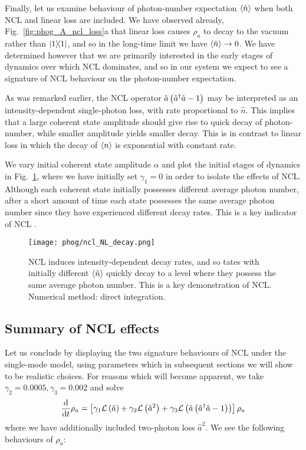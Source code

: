 Finally, let us examine behaviour of photon-number expectation $\ev{\hat{n}}$ when both NCL and linear loss are included. We have observed already, Fig.~\ref{fig:phog_A_ncl_loss}a that linear loss causes $\rho_a$ to decay to the vacuum rather than $\dyad{1}$, and so in the long-time limit we have $\ev{\hat{n}} \rightarrow 0$. We have determined however that we are primarily interested in the early stages of dynamics over which NCL dominates, and so in our system we expect to see a signature of NCL behaviour on the photon-number expectation.

As was remarked earlier, the NCL operator $\hat{a}\left(\hat{a}^\dagger \hat{a} - 1\right)$ may be interpreted as an intensity-dependent single-photon loss, with rate proportional to $\hat{n}$. This implies that a large coherent state amplitude should give rise to quick decay of photon-number, while smaller amplitude yields smaller decay. This is in contrast to linear loss in which the decay of $\ev{n}$ is exponential with constant rate.

We vary initial coherent state amplitude $\alpha$ and plot the initial stages of dynamics in Fig.~\ref{fig:phog_ncl_NL_decay}, where we have initially set $\gamma_1=0$ in order to isolate the effects of NCL. Although each coherent state initially possesses different average photon number, after a short amount of time each state possesses the same average photon number since they have experienced different decay rates. This is a key indicator of NCL \cite{Mogilevtsev2010, Shchesnovich2011}.

\begin{figure}[htp]
\centering
\texttt{[image: phog/ncl\_NL\_decay.png]}
\caption{\label{fig:phog_ncl_NL_decay} NCL induces intensity-dependent decay rates, and so tates with initially different $\ev{\hat{n}}$ quickly decay to a level where they possess the same average photon number. This is a key demonstration of NCL. Numerical method: direct integration.}
\end{figure}


\subsection{Summary of NCL effects}\label{sec:phog_summary_ncl_effects}
Let us conclude by displaying the two signature behaviours of NCL under the single-mode model, using parameters which in subsequent sections we will show to be realistic choices. For reasons which will become apparent, we take $\gamma_2 = 0.0005, \gamma_3 = 0.002$ and solve
\begin{equation}\label{eqn:phog_full_single_mode}
\frac{\mathrm{d}}{\mathrm{d}t} \rho_a = \left[\gamma_1 \mathcal{L}\left(\hat{a}\right) + \gamma_2 \mathcal{L}\left(\hat{a}^2\right) + \gamma_3 \mathcal{L}\left(\hat{a}\left(\hat{a}^\dagger \hat{a} - 1\right)\right) \right] \rho_a
\end{equation}
where we have additionally included two-photon loss $\hat{a}^2$. We see the following behaviours of $\rho_a$:


